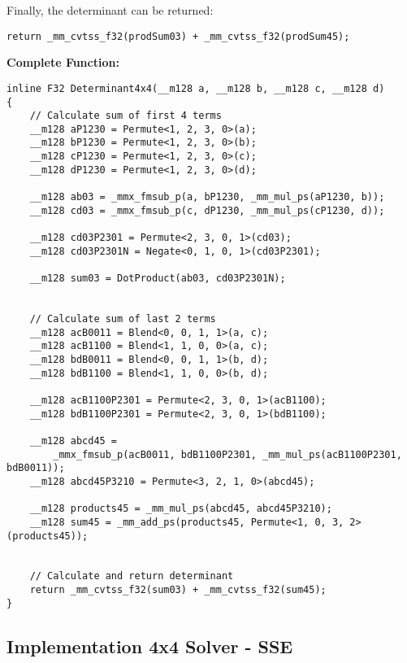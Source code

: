 Finally, the determinant can be returned:

\begin{verbatim}
return _mm_cvtss_f32(prodSum03) + _mm_cvtss_f32(prodSum45);
\end{verbatim}




\vspace{1cm}
\textbf{Complete Function:}

\begin{verbatim}
inline F32 Determinant4x4(__m128 a, __m128 b, __m128 c, __m128 d)
{
    // Calculate sum of first 4 terms
    __m128 aP1230 = Permute<1, 2, 3, 0>(a);
    __m128 bP1230 = Permute<1, 2, 3, 0>(b);
    __m128 cP1230 = Permute<1, 2, 3, 0>(c);
    __m128 dP1230 = Permute<1, 2, 3, 0>(d);

    __m128 ab03 = _mmx_fmsub_p(a, bP1230, _mm_mul_ps(aP1230, b));
    __m128 cd03 = _mmx_fmsub_p(c, dP1230, _mm_mul_ps(cP1230, d));

    __m128 cd03P2301 = Permute<2, 3, 0, 1>(cd03);
    __m128 cd03P2301N = Negate<0, 1, 0, 1>(cd03P2301);

    __m128 sum03 = DotProduct(ab03, cd03P2301N);


    // Calculate sum of last 2 terms
    __m128 acB0011 = Blend<0, 0, 1, 1>(a, c);
    __m128 acB1100 = Blend<1, 1, 0, 0>(a, c);
    __m128 bdB0011 = Blend<0, 0, 1, 1>(b, d);
    __m128 bdB1100 = Blend<1, 1, 0, 0>(b, d);

    __m128 acB1100P2301 = Permute<2, 3, 0, 1>(acB1100);
    __m128 bdB1100P2301 = Permute<2, 3, 0, 1>(bdB1100);

    __m128 abcd45 = 
        _mmx_fmsub_p(acB0011, bdB1100P2301, _mm_mul_ps(acB1100P2301, bdB0011));
    __m128 abcd45P3210 = Permute<3, 2, 1, 0>(abcd45);

    __m128 products45 = _mm_mul_ps(abcd45, abcd45P3210);
    __m128 sum45 = _mm_add_ps(products45, Permute<1, 0, 3, 2>(products45));


    // Calculate and return determinant
    return _mm_cvtss_f32(sum03) + _mm_cvtss_f32(sum45);
}
\end{verbatim}




\newpage
\subsection{Implementation 4x4 Solver - SSE}

